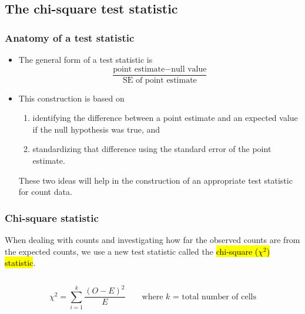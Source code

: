 \documentclass[slidestop,compress,mathserif]{beamer}
\begin{document}

\subsection{The chi-square test statistic}


\begin{frame}
\frametitle{Anatomy of a test statistic}

\begin{itemize}

\item The general form of a test statistic is
\[ \frac{\text{point estimate} - \text{null value}}{\text{SE of point estimate}} \]

\pause

\item This construction is based on 
\begin{enumerate}
\item identifying the difference between a point estimate and an expected value if the null hypothesis was true, and 
\item standardizing that difference using the standard error of the point estimate. 
\end{enumerate}
\pause

These two ideas will help in the construction of an appropriate test statistic for count data.

\end{itemize}

\end{frame}


\begin{frame}
\frametitle{Chi-square statistic}

When dealing with counts and investigating how far the observed counts are from the expected counts, we use a new test statistic called the \hl{chi-square ($\chi^2$) statistic}.

$\:$ \\

\pause

{
\[\chi^2 = \sum_{i = 1}^k \frac{(O - E)^2}{E} \qquad \text{where $k$ = total number of cells} \]
}

\end{frame}

\end{document}
